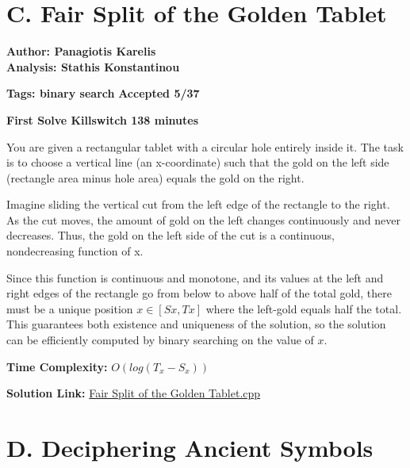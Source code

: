 \documentclass{article}
\begin{document}
\section*{C. Fair Split of the Golden Tablet}

    \textbf{Author: Panagiotis Karelis}\\
    \textbf{Analysis: Stathis Konstantinou}
    
    \vspace{2em}
    
    \noindent \textbf{Tags: binary search} \hfill \textbf{Accepted 5/37}
    
    \hfill \textbf{First Solve Killswitch 138 minutes}
    
    \vspace{2em}
    
    \noindent You are given a rectangular tablet with a circular hole entirely inside it. The task is to choose a vertical line (an x-coordinate) such that the gold on the left side (rectangle area minus hole area) equals the gold on the right.
    
    \noindent Imagine sliding the vertical cut from the left edge of the rectangle to the right. As the cut moves, the amount of gold on the left changes continuously and never decreases. Thus, the gold on the left side of the cut is a continuous, nondecreasing function of x.
    
    \noindent Since this function is continuous and monotone, and its values at the left and right edges of the rectangle go from below to above half of the total gold, there must be a unique position $ x \in [Sx,Tx] $ where the left-gold equals half the total. This guarantees both existence and uniqueness of the solution, so the solution can be efficiently computed by binary searching on the value of $x$.
    
    
    \vspace{1em}
    \noindent \textbf{Time Complexity:}
    $O(log{(T_x - S_x)})$
    \vspace{1em}
    
    \noindent \textbf{Solution Link:} 
    \href{https://github.com/StathisKons/GRCPC-2024-Editorial-Implementations/blob/main/Sample%20Implementations/C.%20Fair%20Split%20of%20the%20Golden%20Tablet.cpp}{Fair Split of the Golden Tablet.cpp}
    
\newpage

\vspace{5em}

\section*{D. Deciphering Ancient Symbols}
\end{document}
